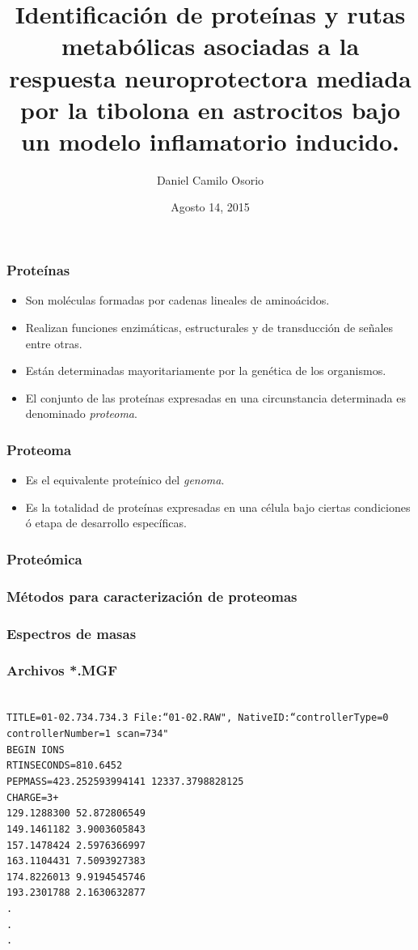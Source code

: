 \documentclass[10pt]{beamer}
\title{Identificación de proteínas y rutas metabólicas asociadas a la respuesta neuroprotectora mediada por la tibolona en astrocitos bajo un modelo inflamatorio inducido.\vspace{-0.75\baselineskip}}
\date{Agosto 14, 2015}
\author{Daniel Camilo Osorio}
\institute{\textbf{Maestría en Bioinformática}\\ Universidad Nacional de Colombia\\\textbf{Laboratorio de Bioquímica Computacional y Bioinformática} \\ Pontificia Universidad Javeriana}
\begin{document}
\maketitle
\begin{frame}
\frametitle{Proteínas}
\begin{itemize}
\item Son moléculas formadas por cadenas lineales de aminoácidos.
\pause
\item Realizan funciones enzimáticas, estructurales y de transducción de señales entre otras.
\pause
\item Están determinadas mayoritariamente por la genética de los organismos.
\pause
\item El conjunto de las proteínas expresadas en una circunstancia determinada es denominado \emph{proteoma}.
\end{itemize}
\end{frame}
\begin{frame}
\frametitle{Proteoma}
\begin{itemize}
\item Es el equivalente proteínico del \emph{genoma}.
\item Es la totalidad de proteínas expresadas en una célula bajo ciertas condiciones ó etapa de desarrollo específicas.
\end{itemize}
\end{frame}
\begin{frame}
\frametitle{Proteómica}
\end{frame}
\begin{frame}
\frametitle{Métodos para caracterización de proteomas}
\end{frame}
\begin{frame}
\frametitle{Espectros de masas}
\end{frame}
\begin{frame}
\frametitle{Archivos *.MGF}
\texttt{
\\
TITLE=01-02.734.734.3 File:``01-02.RAW", NativeID:``controllerType=0 controllerNumber=1 scan=734"\\
BEGIN IONS\\
RTINSECONDS=810.6452\\
PEPMASS=423.252593994141 12337.3798828125\\
CHARGE=3+\\
129.1288300 52.872806549 \\
149.1461182 3.9003605843 \\
157.1478424 2.5976366997 \\
163.1104431 7.5093927383 \\
174.8226013 9.9194545746 \\
193.2301788 2.1630632877 \\
.\\
.\\
.\\
}
\end{frame}
\end{document}
